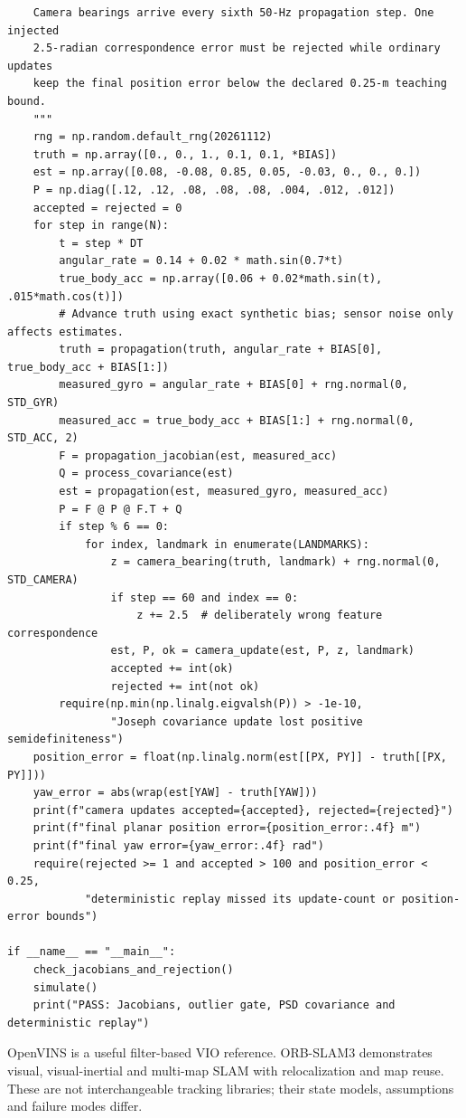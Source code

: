 \begin{verbatim}
    Camera bearings arrive every sixth 50-Hz propagation step. One injected
    2.5-radian correspondence error must be rejected while ordinary updates
    keep the final position error below the declared 0.25-m teaching bound.
    """
    rng = np.random.default_rng(20261112)
    truth = np.array([0., 0., 1., 0.1, 0.1, *BIAS])
    est = np.array([0.08, -0.08, 0.85, 0.05, -0.03, 0., 0., 0.])
    P = np.diag([.12, .12, .08, .08, .08, .004, .012, .012])
    accepted = rejected = 0
    for step in range(N):
        t = step * DT
        angular_rate = 0.14 + 0.02 * math.sin(0.7*t)
        true_body_acc = np.array([0.06 + 0.02*math.sin(t), .015*math.cos(t)])
        # Advance truth using exact synthetic bias; sensor noise only affects estimates.
        truth = propagation(truth, angular_rate + BIAS[0], true_body_acc + BIAS[1:])
        measured_gyro = angular_rate + BIAS[0] + rng.normal(0, STD_GYR)
        measured_acc = true_body_acc + BIAS[1:] + rng.normal(0, STD_ACC, 2)
        F = propagation_jacobian(est, measured_acc)
        Q = process_covariance(est)
        est = propagation(est, measured_gyro, measured_acc)
        P = F @ P @ F.T + Q
        if step % 6 == 0:
            for index, landmark in enumerate(LANDMARKS):
                z = camera_bearing(truth, landmark) + rng.normal(0, STD_CAMERA)
                if step == 60 and index == 0:
                    z += 2.5  # deliberately wrong feature correspondence
                est, P, ok = camera_update(est, P, z, landmark)
                accepted += int(ok)
                rejected += int(not ok)
        require(np.min(np.linalg.eigvalsh(P)) > -1e-10,
                "Joseph covariance update lost positive semidefiniteness")
    position_error = float(np.linalg.norm(est[[PX, PY]] - truth[[PX, PY]]))
    yaw_error = abs(wrap(est[YAW] - truth[YAW]))
    print(f"camera updates accepted={accepted}, rejected={rejected}")
    print(f"final planar position error={position_error:.4f} m")
    print(f"final yaw error={yaw_error:.4f} rad")
    require(rejected >= 1 and accepted > 100 and position_error < 0.25,
            "deterministic replay missed its update-count or position-error bounds")

if __name__ == "__main__":
    check_jacobians_and_rejection()
    simulate()
    print("PASS: Jacobians, outlier gate, PSD covariance and deterministic replay")
\end{verbatim}

OpenVINS is a useful filter-based VIO reference. ORB-SLAM3 demonstrates visual, visual-inertial and multi-map SLAM with relocalization and map reuse. These are not interchangeable tracking libraries; their state models, assumptions and failure modes differ.

